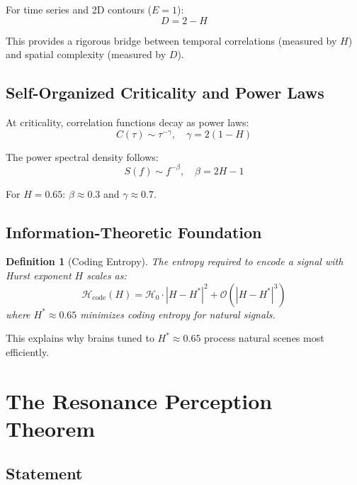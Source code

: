 \documentclass[11pt,a4paper]{article}
\newtheorem{definition}{Definition}
\begin{document}
For time series and 2D contours ($E = 1$):
\begin{equation}
D = 2 - H
\end{equation}

This provides a rigorous bridge between temporal correlations (measured by $H$) and spatial complexity (measured by $D$).

\subsection{Self-Organized Criticality and Power Laws}

At criticality, correlation functions decay as power laws:
\begin{equation}
C(\tau) \sim \tau^{-\gamma}, \quad \gamma = 2(1-H)
\end{equation}

The power spectral density follows:
\begin{equation}
S(f) \sim f^{-\beta}, \quad \beta = 2H - 1
\end{equation}

For $H = 0.65$: $\beta \approx 0.3$ and $\gamma \approx 0.7$.

\subsection{Information-Theoretic Foundation}

\begin{definition}[Coding Entropy]
The entropy required to encode a signal with Hurst exponent $H$ scales as:
\begin{equation}
\mathcal{H}_{\text{code}}(H) = \mathcal{H}_0 \cdot |H - H^*|^2 + \mathcal{O}(|H-H^*|^3)
\end{equation}
where $H^* \approx 0.65$ minimizes coding entropy for natural signals.
\end{definition}

This explains why brains tuned to $H^* \approx 0.65$ process natural scenes most efficiently.

\section{The Resonance Perception Theorem}

\subsection{Statement}
\end{document}
